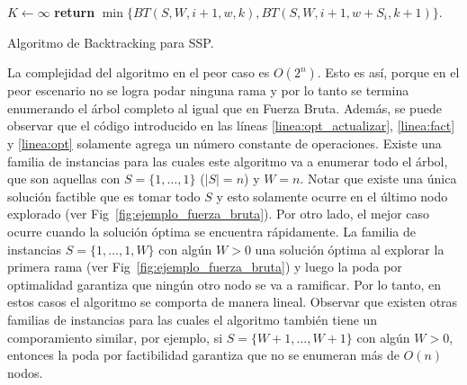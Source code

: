 \documentclass[10pt,a4paper]{article}
\begin{document}
\begin{algorithm}
\begin{algorithmic}[1]
\State $K \gets \infty$
         \label{linea:opt_actualizar}
    \EndIf
     \label{linea:fact}
     \label{linea:opt}
    \State \textbf{return} $\min \{ BT(S, W, i+1, w, k), BT(S, W, i+1, w+S_i, k+1) \}$.
\EndFunction
\end{algorithmic}
\caption{Algoritmo de Backtracking para SSP.}
\label{alg:backtracking}
\end{algorithm}

La complejidad del algoritmo en el peor caso es $O(2^n)$. Esto es así, porque en el peor escenario no se logra podar ninguna rama y por lo tanto se termina enumerando el árbol completo al igual que en Fuerza Bruta. Además, se puede observar que el código introducido en las líneas \ref{linea:opt_actualizar}, \ref{linea:fact} y \ref{linea:opt} solamente agrega un número constante de operaciones. Existe una familia de instancias para las cuales este algoritmo va a enumerar todo el árbol, que son aquellas con $S=\{1, \hdots, 1\}$ ($|S|=n$) y $W=n$. Notar que existe una única solución factible que es tomar todo $S$ y esto solamente ocurre en el último nodo explorado (ver Fig~\ref{fig:ejemplo_fuerza_bruta}). Por otro lado, el mejor caso ocurre cuando la solución óptima se encuentra rápidamente. La familia de instancias $S=\{1, \hdots, 1, W\}$ con algún $W > 0$ una solución óptima al explorar la primera rama (ver Fig~\ref{fig:ejemplo_fuerza_bruta}) y luego la poda por optimalidad garantiza que ningún otro nodo se va a ramificar. Por lo tanto, en estos casos el algoritmo se comporta de manera lineal. Observar que existen otras familias de instancias para las cuales el algoritmo también tiene un comporamiento similar, por ejemplo, si $S = \{ W+1, \hdots, W+1 \}$ con algún $W > 0$, entonces la poda por factibilidad garantiza que no se enumeran más de $O(n)$ nodos.
\end{document}
